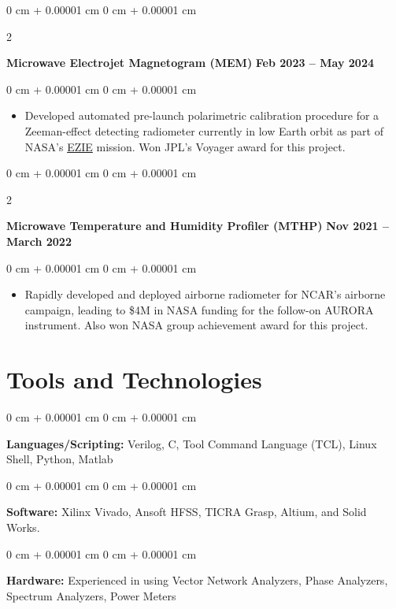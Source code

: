 \documentclass[10pt, letterpaper]{article}
\newenvironment{highlights}{
    \begin{itemize}[
        topsep=0.10 cm,
        parsep=0.10 cm,
        partopsep=0pt,
        itemsep=0pt,
        leftmargin=0 cm + 10pt     
    ]
}{
    \end{itemize}
} %
\newenvironment{onecolentry}{
    \begin{adjustwidth}{
        0 cm + 0.00001 cm
    }{
        0 cm + 0.00001 cm
    }
}{
    \end{adjustwidth}
} %
\newenvironment{twocolentry}[2][]{
    \onecolentry
    \def\secondColumn{#2}
    \setcolumnwidth{\fill, 4.5 cm}
    \begin{paracol}{2}
}{
    \switchcolumn \raggedleft \secondColumn
    \end{paracol}
    \endonecolentry
} %
\begin{document}
        \begin{twocolentry}{
            \textbf{Feb 2023 -- May 2024}
        }
            \textbf{Microwave Electrojet Magnetogram (MEM)}\end{twocolentry}

        \vspace{0.20 cm}
        \begin{onecolentry}
            \begin{highlights}
                \item Developed automated pre-launch polarimetric calibration procedure for a Zeeman-effect detecting radiometer currently in low Earth orbit as part of NASA's  \href{https://science.nasa.gov/mission/ezie/}{EZIE} mission. Won JPL's Voyager award for this project.              
            \end{highlights}
        \end{onecolentry}
        \vspace{0.3cm}
        
        \begin{twocolentry}{
            \textbf{Nov 2021 -- March 2022}
        }
            \textbf{Microwave Temperature and Humidity Profiler (MTHP)}\end{twocolentry}

        \vspace{0.20 cm}
        \begin{onecolentry}
            \begin{highlights}
                \item Rapidly developed and deployed airborne radiometer for NCAR's airborne campaign, leading to \$4M in NASA funding for the follow-on AURORA instrument. Also won NASA group achievement award for this project.
            \end{highlights}
        \end{onecolentry}
        \vspace{0.1 cm}

    \section{Tools and Technologies}        
        \begin{onecolentry}
            \textbf{Languages/Scripting:} Verilog, C, Tool Command Language (TCL), Linux Shell, Python, Matlab
        \end{onecolentry}
        \vspace{0.2 cm}
        \begin{onecolentry}
            \textbf{Software:} Xilinx Vivado, Ansoft HFSS, TICRA Grasp, Altium, and Solid Works. 
        \end{onecolentry}
        \vspace{0.2 cm}
        \begin{onecolentry}
            \textbf{Hardware:}  Experienced in using Vector Network Analyzers, Phase Analyzers, Spectrum Analyzers, Power Meters
        \end{onecolentry} 
\end{document}
